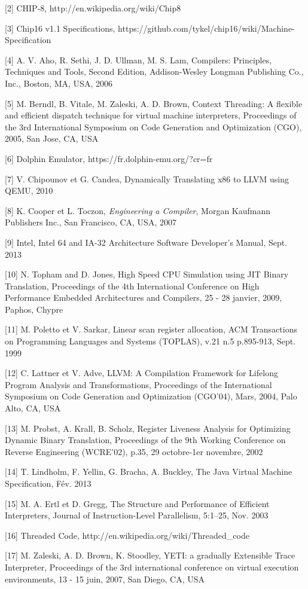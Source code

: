 \documentclass{article} %
\begin{document}
[2]		CHIP-8, http://en.wikipedia.org/wiki/Chip8

[3]		Chip16 v1.1 Specifications, https://github.com/tykel/chip16/wiki/Machine-Specification

[4]		A. V. Aho, R. Sethi, J. D. Ullman, M. S. Lam, Compilers: Principles, Techniques and Tools, Second Edition, Addison-Wesley Longman Publishing Co., Inc., Boston, MA, USA, 2006

[5]		M. Berndl, B. Vitale, M. Zaleski, A. D. Brown, Context Threading: A flexible and efficient dispatch technique for virtual machine interpreters, Proceedings of the 3rd International Symposium on Code Generation and Optimization (CGO), 2005, San Jose, CA, USA

[6]		Dolphin Emulator, https://fr.dolphin-emu.org/?cr=fr

[7]		V. Chipounov et G. Candea, Dynamically Translating x86 to LLVM using QEMU, 2010

[8]		K. Cooper et L. Toczon, \textit{Engineering a Compiler}, Morgan Kaufmann Publishers Inc., San Francisco, CA, USA, 2007

[9]		Intel, Intel 64 and IA-32 Architecture Software Developer's Manual, Sept. 2013

[10]	N. Topham and D. Jones, High Speed CPU Simulation using JIT Binary Translation, Proceedings of the 4th International Conference on High Performance Embedded Architectures and Compilers, 25 - 28 janvier, 2009, Paphos, Chypre

[11]	M. Poletto et V. Sarkar, Linear scan register allocation, ACM Transactions on Programming Languages and Systems (TOPLAS), v.21 n.5 p.895-913, Sept. 1999

[12]	C. Lattner et V. Adve, LLVM: A Compilation Framework for Lifelong Program Analysis and Transformations, Proceedings of the International Symposium on Code Generation and Optimization (CGO'04), Mars, 2004, Palo Alto, CA, USA

[13]	M. Probst, A. Krall, B. Scholz, Register Liveness Analysis for Optimizing Dynamic Binary Translation, Proceedings of the 9th Working Conference on Reverse Engineering (WCRE'02), p.35, 29 octobre-1er novembre, 2002

[14]	T. Lindholm, F. Yellin, G. Bracha, A. Buckley, The Java Virtual Machine Specification, Fév. 2013

[15]	M. A. Ertl et D. Gregg, The Structure and Performance of Efficient Interpreters, Journal of Instruction-Level Parallelism, 5:1--25, Nov. 2003

[16]	Threaded Code, http://en.wikipedia.org/wiki/Threaded\_code

[17]	M. Zaleski, A. D. Brown, K. Stoodley, YETI: a gradually Extensible Trace Interpreter, Proceedings of the 3rd international conference on virtual execution environments, 13 - 15 juin, 2007, San Diego, CA, USA
\end{document}
